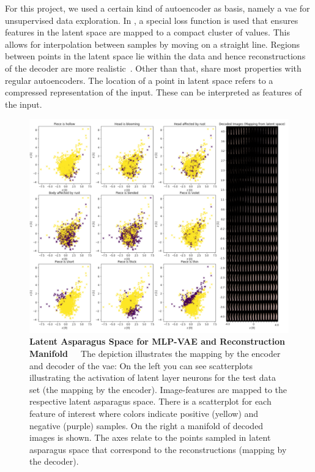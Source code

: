 \bigskip
For this project, we used a certain kind of autoencoder as basis, namely a \acrfull{vae} for unsupervised data exploration. In , a special loss function is used that ensures features in the latent space are mapped to a compact cluster of values. This allows for interpolation between samples by moving on a straight line. Regions between points in the latent space lie within the data and hence reconstructions of the decoder are more realistic~\citep{keras2020vae}. Other than that,  share most properties with regular autoencoders. The location of a point in latent space refers to a compressed representation of the input. These can be interpreted as features of the input.

\begin{figure}[h]
	\centering
	\includegraphics[scale=0.8]{Figures/chapter04/autoencoder_latent_asparagus.png}
	\decoRule
	\caption[Latent Asparagus Space for MLP-VAE and Reconstruction Manifold]{\textbf{Latent Asparagus Space for MLP-VAE and Reconstruction Manifold}~~~The depiction illustrates the mapping by the encoder and decoder of the \acrshort{vae}: On the left you can see scatterplots illustrating the activation of latent layer neurons for the test data set (the mapping by the encoder). Image-features are mapped to the respective latent asparagus space. There is a scatterplot for each feature of interest where colors indicate positive (yellow) and negative (purple) samples. On the right a manifold of decoded images is shown. The axes relate to the points sampled in latent asparagus space that correspond to the reconstructions (mapping by the decoder).}
	\label{fig:AutoencoderLatentSpace}
\end{figure}

